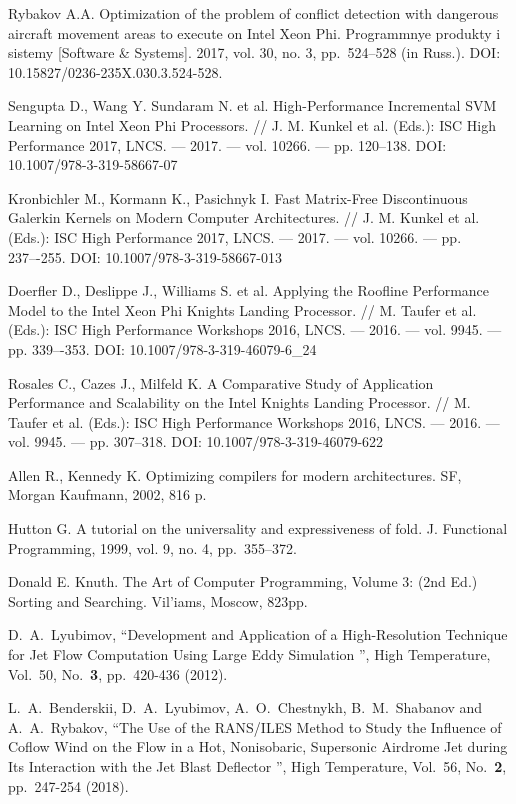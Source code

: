 \documentclass[
11pt,%
tightenlines,%
twoside,%
onecolumn,%
nofloats,%
nobibnotes,%
nofootinbib,%
superscriptaddress,%
noshowpacs,%
centertags]%
{revtex4}
\begin{document}
\begin{thebibliography}{99}
Rybakov A.A. Optimization of the problem of conflict detection with dangerous aircraft movement areas to execute on Intel Xeon Phi. Programmnye produkty i sistemy [Software \& Systems]. 2017, vol. 30, no. 3, pp.~524–528 (in Russ.). DOI: 10.15827/0236-235X.030.3.524-528.

Sengupta D., Wang Y. Sundaram N. et al. High-Performance Incremental SVM Learning on Intel Xeon Phi Processors. // J. M. Kunkel et al. (Eds.): ISC High Performance 2017, LNCS. — 2017. — vol. 10266. — pp. 120–138. DOI: 10.1007/978-3-319-58667-07

Kronbichler M., Kormann K., Pasichnyk I. Fast Matrix-Free Discontinuous Galerkin Kernels on Modern Computer Architectures. // J. M. Kunkel et al. (Eds.): ISC High Performance 2017, LNCS. — 2017. — vol. 10266. — pp. 237–-255. DOI: 10.1007/978-3-319-58667-013

Doerfler D., Deslippe J., Williams S. et al. Applying the Roofline Performance Model to the Intel Xeon Phi Knights Landing Processor. // M. Taufer et al. (Eds.): ISC High Performance Workshops 2016, LNCS. — 2016. — vol. 9945. — pp. 339–-353. DOI: 10.1007/978-3-319-46079-6\_24

Rosales C., Cazes J., Milfeld K. A Comparative Study of Application Performance and Scalability on the Intel Knights Landing Processor. // M. Taufer et al. (Eds.): ISC High Performance Workshops 2016, LNCS. — 2016. — vol. 9945. — pp. 307–318. DOI: 10.1007/978-3-319-46079-622


Allen R., Kennedy K. Optimizing compilers for modern architectures. SF, Morgan Kaufmann, 2002, 816 p.

Hutton G. A tutorial on the universality and expressiveness of fold. J. Functional Programming, 1999, vol. 9, no. 4, pp.~355–372.

Donald E. Knuth. The Art of Computer Programming, Volume 3: (2nd Ed.) Sorting and Searching. Vil'iams, Moscow, 823pp.

D.~A.~Lyubimov, \textquotedblleft Development and Application of a High-Resolution Technique for Jet Flow Computation Using Large Eddy Simulation \textquotedblright, High Temperature, Vol.~50, No.~\textbf{3}, pp.~420-436 (2012).

L.~A.~Benderskii, D.~A.~Lyubimov, A.~O.~Chestnykh, B.~M.~Shabanov and A.~A.~Rybakov, \textquotedblleft The Use of the RANS/ILES Method to Study the Influence of Coflow Wind on the Flow in a Hot, Nonisobaric, Supersonic Airdrome Jet during Its Interaction with the Jet Blast Deflector \textquotedblright, High Temperature, Vol.~56, No.~\textbf{2}, pp.~247-254 (2018).


\end{thebibliography}
\end{document}
